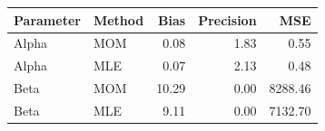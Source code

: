 \documentclass{article}\usepackage[]{graphicx}\usepackage[]{xcolor}
\newenvironment{Figure}
  {\par\medskip\noindent\minipage{\linewidth}}
  {\endminipage\par\medskip}
\begin{document}
\begin{multicols}{2}
\begin{Figure}
\centering
\begin{tabular}{llrrr}
  \hline
 Parameter & Method & Bias & Precision & MSE \\ 
  \hline
  Alpha & MOM & 0.08 & 1.83 & 0.55 \\ 
  Alpha & MLE & 0.07 & 2.13 & 0.48 \\ 
  Beta & MOM & 10.29 & 0.00 & 8288.46 \\ 
  Beta & MLE & 9.11 & 0.00 & 7132.70 \\ 
   \hline
\end{tabular}
\end{Figure}

\vspace{2em}

\begin{tiny}

\end{tiny}

\end{multicols}
\end{document}
